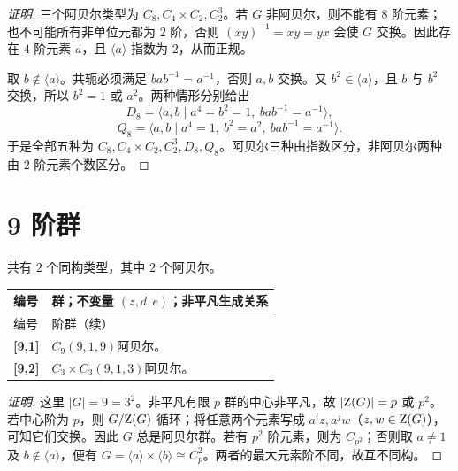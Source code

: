 \documentclass[UTF8,fontset=fandol,11pt,a4paper]{ctexart}
\begin{document}
\begin{proof}[证明]
三个阿贝尔类型为 $C_8,C_4\times C_2,C_2^3$。若 $G$ 非阿贝尔，则不能有 $8$ 阶元素；也不可能所有非单位元都为 $2$ 阶，否则 $(xy)^{-1}=xy=yx$ 会使 $G$ 交换。因此存在 $4$ 阶元素 $a$，且 $\langle a\rangle$ 指数为 $2$，从而正规。

取 $b\notin\langle a\rangle$。共轭必须满足 $bab^{-1}=a^{-1}$，否则 $a,b$ 交换。又 $b^2\in\langle a\rangle$，且 $b$ 与 $b^2$ 交换，所以 $b^2=1$ 或 $a^2$。两种情形分别给出
\[
D_8=\langle a,b\mid a^4=b^2=1,\ bab^{-1}=a^{-1}\rangle,
\]
\[
Q_8=\langle a,b\mid a^4=1,\ b^2=a^2,\ bab^{-1}=a^{-1}\rangle.
\]
于是全部五种为 $C_8,C_4\times C_2,C_2^3,D_8,Q_8$。阿贝尔三种由指数区分，非阿贝尔两种由 $2$ 阶元素个数区分。
\end{proof}

\section*{9 阶群}\label{order:9}

共有 $2$ 个同构类型，其中 $2$ 个阿贝尔。

\begingroup\small\setlength{\tabcolsep}{3pt}\renewcommand{\arraystretch}{1.12}

\begin{longtable}{@{}p{17mm}>{\raggedright\arraybackslash}p{141mm}@{}}

\toprule 编号 & 群；不变量 $(z,d,e)$；非平凡生成关系\\\midrule\endfirsthead

\toprule 编号 & 9 阶群（续）\\\midrule\endhead\bottomrule\endfoot

\textbf{[9,1]} & $C_{9}$\quad $(9,1,9)$\quad 阿贝尔。\\[3pt]

\textbf{[9,2]} & $C_{3}\times C_{3}$\quad $(9,1,3)$\quad 阿贝尔。\\[3pt]

\end{longtable}\endgroup

\begin{proof}[证明]
这里 $|G|=9=3^2$。非平凡有限 $p$ 群的中心非平凡，故 $|\mathrm Z(G)|=p$ 或 $p^2$。若中心阶为 $p$，则 $G/\mathrm Z(G)$ 循环；将任意两个元素写成 $a^iz,a^jw$（$z,w\in\mathrm Z(G)$），可知它们交换。因此 $G$ 总是阿贝尔群。若有 $p^2$ 阶元素，则为 $C_{p^2}$；否则取 $a\ne1$ 及 $b\notin\langle a\rangle$，便有 $G=\langle a\rangle\times\langle b\rangle\cong C_p^2$。两者的最大元素阶不同，故互不同构。
\end{proof}
\end{document}
